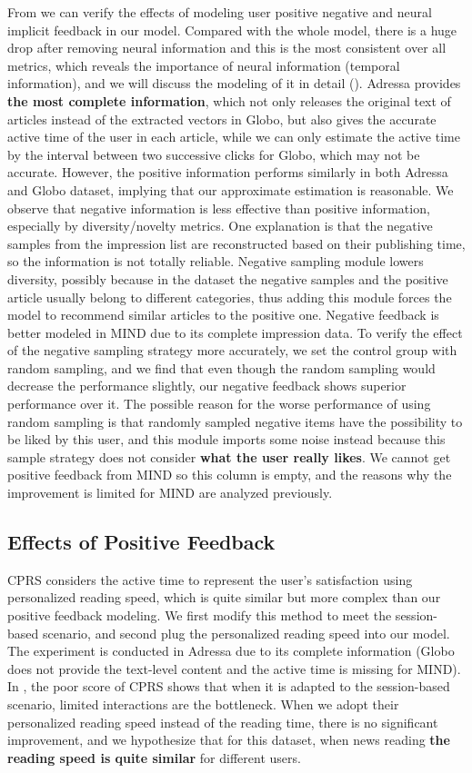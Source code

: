 From  we can verify the effects of modeling user positive negative and neural implicit feedback in our model. Compared with the whole model, there is a huge drop after removing neural information and this is the most consistent over all metrics, which reveals the importance of neural information (temporal information), and we will discuss the modeling of it in detail (). Adressa 
 provides \textbf{the most complete information}, which not only releases the original 
text of articles instead of the extracted vectors in Globo, but also gives the accurate active time 
of the user in each article, while we can only estimate the active time by the interval between 
two successive clicks for Globo, which may not be accurate. However, the positive information performs similarly in both Adressa and Globo dataset, implying that our approximate estimation is reasonable. We observe that negative information is less effective than positive information, especially by diversity/novelty metrics. 
One explanation is that the negative samples from the impression list are reconstructed based on their publishing time, so the information is not totally reliable. Negative sampling module lowers diversity, possibly because in the dataset the negative samples and the positive article usually belong to different categories, thus adding this module forces the model to recommend similar articles to the positive one. Negative feedback is better modeled in MIND due to its complete impression data. To verify the effect of the negative sampling strategy more accurately, we set the control group with random sampling, and we find that even though the random sampling would decrease the performance slightly, our negative feedback shows superior performance over it. The possible reason for the worse performance of using random sampling is that randomly sampled negative items have the possibility to be liked by this user, and this module imports some noise instead because this sample strategy does not consider \textbf{what the user really likes}. 
We cannot get positive feedback from MIND so this column is empty, and the reasons why the improvement is limited for MIND are analyzed previously.

\subsection{Effects of Positive Feedback}
CPRS considers the active time to represent the user's satisfaction using personalized reading speed, which is quite similar but more complex than our positive feedback modeling. We first modify this method to meet the 
session-based scenario, and second plug the personalized reading speed into our model. 
The experiment is conducted in Adressa due to its complete information 
(Globo does not provide the text-level content and the active time is missing for MIND). 
In , the poor score of CPRS shows that when it is adapted to the session-based scenario, 
limited interactions are the bottleneck. When we adopt their personalized reading speed instead of 
the reading time, there is no significant improvement, and we hypothesize that for this dataset, 
when news reading \textbf{the reading speed is quite similar} for different users.

